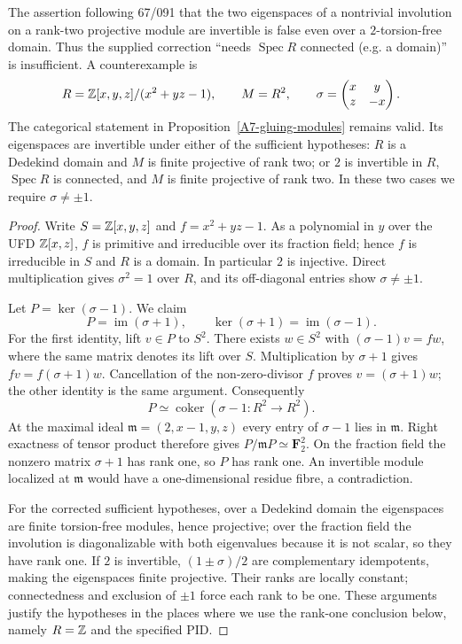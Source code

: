 \begin{theorem}\label{A7-domain-counterexample}
The assertion following 67/091 that the two eigenspaces of a nontrivial involution on a rank-two projective module are invertible is false even over a $2$-torsion-free domain. Thus the supplied correction ``needs $\operatorname{Spec}R$ connected (e.g. a domain)'' is insufficient.
A counterexample is
\[
 R={\mathbb{Z}}[x,y,z]/(x^2+yz-1),\qquad M=R^2,
 \qquad \sigma=\begin{pmatrix}x&y\\z&-x\end{pmatrix}.
\]
The categorical statement in Proposition~\ref{A7-gluing-modules} remains valid. Its eigenspaces are invertible under either of the sufficient hypotheses: $R$ is a Dedekind domain and $M$ is finite projective of rank two; or $2$ is invertible in $R$, $\operatorname{Spec}R$ is connected, and $M$ is finite projective of rank two. In these two cases we require $\sigma\ne\pm1$.
\end{theorem}
\begin{proof}
Write $S={\mathbb{Z}}[x,y,z]$ and $f=x^2+yz-1$. As a polynomial in $y$ over the UFD ${\mathbb{Z}}[x,z]$, $f$ is primitive and irreducible over its fraction field; hence $f$ is irreducible in $S$ and $R$ is a domain. In particular $2$ is injective. Direct multiplication gives $\sigma^2=1$ over $R$, and its off-diagonal entries show $\sigma\ne\pm1$.

Let $P=\ker(\sigma-1)$. We claim
\[
 P=\operatorname{im}(\sigma+1),\qquad
 \ker(\sigma+1)=\operatorname{im}(\sigma-1).
\]
For the first identity, lift $v\in P$ to $S^2$. There exists $w\in S^2$ with $(\sigma-1)v=fw$, where the same matrix denotes its lift over $S$. Multiplication by $\sigma+1$ gives $fv=f(\sigma+1)w$. Cancellation of the non-zero-divisor $f$ proves $v=(\sigma+1)w$; the other identity is the same argument. Consequently
\[
 P\simeq\operatorname{coker}(\sigma-1:R^2\to R^2).
\]
At the maximal ideal $\mathfrak m=(2,x-1,y,z)$ every entry of $\sigma-1$ lies in $\mathfrak m$. Right exactness of tensor product therefore gives
$P/\mathfrak mP\simeq\mathbf F_2^2$. On the fraction field the nonzero matrix $\sigma+1$ has rank one, so $P$ has rank one. An invertible module localized at $\mathfrak m$ would have a one-dimensional residue fibre, a contradiction.

For the corrected sufficient hypotheses, over a Dedekind domain the eigenspaces are finite torsion-free modules, hence projective; over the fraction field the involution is diagonalizable with both eigenvalues because it is not scalar, so they have rank one. If $2$ is invertible, $(1\pm\sigma)/2$ are complementary idempotents, making the eigenspaces finite projective. Their ranks are locally constant; connectedness and exclusion of $\pm1$ force each rank to be one. These arguments justify the hypotheses in the places where we use the rank-one conclusion below, namely $R={\mathbb{Z}}$ and the specified PID.
\end{proof}

